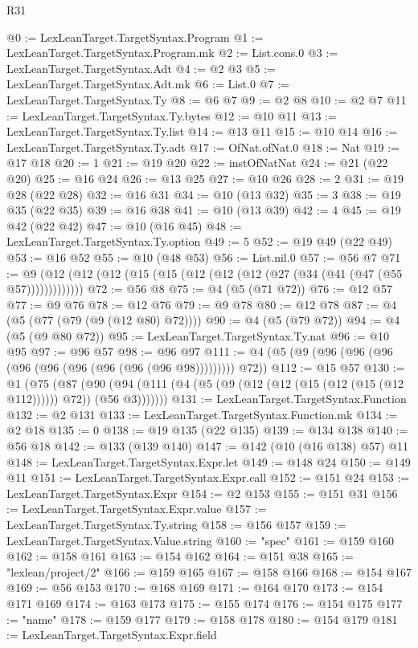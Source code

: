 \begin{lexlean}{R31}
\begin{coremodule}
@0 := LexLeanTarget.TargetSyntax.Program
@1 := LexLeanTarget.TargetSyntax.Program.mk
@2 := List.cons.{0}
@3 := LexLeanTarget.TargetSyntax.Adt
@4 := @2 @3
@5 := LexLeanTarget.TargetSyntax.Adt.mk
@6 := List.{0}
@7 := LexLeanTarget.TargetSyntax.Ty
@8 := @6 @7
@9 := @2 @8
@10 := @2 @7
@11 := LexLeanTarget.TargetSyntax.Ty.bytes
@12 := @10 @11
@13 := LexLeanTarget.TargetSyntax.Ty.list
@14 := @13 @11
@15 := @10 @14
@16 := LexLeanTarget.TargetSyntax.Ty.adt
@17 := OfNat.ofNat.{0}
@18 := Nat
@19 := @17 @18
@20 := 1
@21 := @19 @20
@22 := instOfNatNat
@24 := @21 (@22 @20)
@25 := @16 @24
@26 := @13 @25
@27 := @10 @26
@28 := 2
@31 := @19 @28 (@22 @28)
@32 := @16 @31
@34 := @10 (@13 @32)
@35 := 3
@38 := @19 @35 (@22 @35)
@39 := @16 @38
@41 := @10 (@13 @39)
@42 := 4
@45 := @19 @42 (@22 @42)
@47 := @10 (@16 @45)
@48 := LexLeanTarget.TargetSyntax.Ty.option
@49 := 5
@52 := @19 @49 (@22 @49)
@53 := @16 @52
@55 := @10 (@48 @53)
@56 := List.nil.{0}
@57 := @56 @7
@71 := @9 (@12 (@12 (@12 (@15 (@15 (@12 (@12 (@12 (@27 (@34 (@41 (@47 (@55 @57)))))))))))))
@72 := @56 @8
@75 := @4 (@5 (@71 @72))
@76 := @12 @57
@77 := @9 @76
@78 := @12 @76
@79 := @9 @78
@80 := @12 @78
@87 := @4 (@5 (@77 (@79 (@9 (@12 @80) @72))))
@90 := @4 (@5 (@79 @72))
@94 := @4 (@5 (@9 @80 @72))
@95 := LexLeanTarget.TargetSyntax.Ty.nat
@96 := @10 @95
@97 := @96 @57
@98 := @96 @97
@111 := @4 (@5 (@9 (@96 (@96 (@96 (@96 (@96 (@96 (@96 (@96 (@96 @98))))))))) @72))
@112 := @15 @57
@130 := @1
    (@75
      (@87 (@90 (@94 (@111 (@4 (@5 (@9 (@12 (@12 (@15 (@12 (@15 (@12 @112)))))) @72)) (@56 @3)))))))
@131 := LexLeanTarget.TargetSyntax.Function
@132 := @2 @131
@133 := LexLeanTarget.TargetSyntax.Function.mk
@134 := @2 @18
@135 := 0
@138 := @19 @135 (@22 @135)
@139 := @134 @138
@140 := @56 @18
@142 := @133 (@139 @140)
@147 := @142 (@10 (@16 @138) @57) @11
@148 := LexLeanTarget.TargetSyntax.Expr.let
@149 := @148 @24
@150 := @149 @11
@151 := LexLeanTarget.TargetSyntax.Expr.call
@152 := @151 @24
@153 := LexLeanTarget.TargetSyntax.Expr
@154 := @2 @153
@155 := @151 @31
@156 := LexLeanTarget.TargetSyntax.Expr.value
@157 := LexLeanTarget.TargetSyntax.Ty.string
@158 := @156 @157
@159 := LexLeanTarget.TargetSyntax.Value.string
@160 := "spec"
@161 := @159 @160
@162 := @158 @161
@163 := @154 @162
@164 := @151 @38
@165 := "lexlean/project/2"
@166 := @159 @165
@167 := @158 @166
@168 := @154 @167
@169 := @56 @153
@170 := @168 @169
@171 := @164 @170
@173 := @154 @171 @169
@174 := @163 @173
@175 := @155 @174
@176 := @154 @175
@177 := "name"
@178 := @159 @177
@179 := @158 @178
@180 := @154 @179
@181 := LexLeanTarget.TargetSyntax.Expr.field

\end{coremodule}
\end{lexlean}
